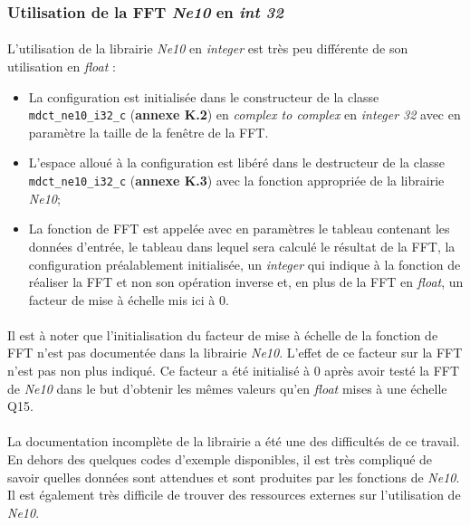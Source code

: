 \documentclass{article}
\begin{document}
    \subsubsection{Utilisation de la FFT \emph{Ne10} en \emph{int 32}}
    \paragraph{}
    L'utilisation de la librairie \emph{Ne10} en \emph{integer} est très peu différente de son utilisation en \emph{float} :
    \begin{itemize}
        \item La configuration est initialisée dans le constructeur de la classe \texttt{mdct\_ne10\_i32\_c} (\textbf{annexe 
        K.2}) en \emph{complex to complex} en \emph{integer 32} avec en paramètre la taille de la fenêtre de la FFT.
        \item L'espace alloué à la configuration est libéré dans le destructeur de la classe \texttt{mdct\_ne10\_i32\_c} (\textbf{annexe K.3}) avec la fonction appropriée de la librairie \emph{Ne10};
        \item La fonction de FFT est appelée avec en paramètres le tableau contenant les données d'entrée, le tableau dans lequel sera calculé le résultat de la FFT, la configuration préalablement initialisée, un \emph{integer} qui indique à la fonction de réaliser la FFT et non son opération inverse et, en plus de la FFT en \emph{float}, un facteur de mise à échelle mis ici à $0$.
    \end{itemize}

    \paragraph{}
    Il est à noter que l'initialisation du facteur de mise à échelle de la fonction de FFT n'est pas documentée dans la librairie \emph{Ne10}. L'effet de ce facteur sur la FFT n'est pas non plus indiqué. Ce facteur a été initialisé à 0 après avoir testé la FFT de \emph{Ne10} dans le but d'obtenir les mêmes valeurs qu'en \emph{float} mises à une échelle Q15.

    \paragraph{}
    La documentation incomplète de la librairie a été une des difficultés de ce travail. En dehors des quelques codes d'exemple disponibles, il est très compliqué de savoir quelles données sont attendues et sont produites par les fonctions de \emph{Ne10}. Il est également très difficile de trouver des ressources externes sur l'utilisation de \emph{Ne10}.
\end{document}
